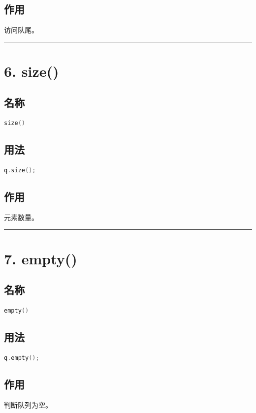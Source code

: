 \documentclass[9pt,twocolumn]{extarticle}
\begin{document}
\subsection{作用}
访问队尾。

\noindent\rule{\linewidth}{0.4pt}

\section{6. size()}

\subsection{名称}
\begin{lstlisting}[language=C++]
size()
\end{lstlisting}

\subsection{用法}
\begin{lstlisting}[language=C++]
q.size();
\end{lstlisting}

\subsection{作用}
元素数量。

\noindent\rule{\linewidth}{0.4pt}

\section{7. empty()}

\subsection{名称}
\begin{lstlisting}[language=C++]
empty()
\end{lstlisting}

\subsection{用法}
\begin{lstlisting}[language=C++]
q.empty();
\end{lstlisting}

\subsection{作用}
判断队列为空。
\end{document}
